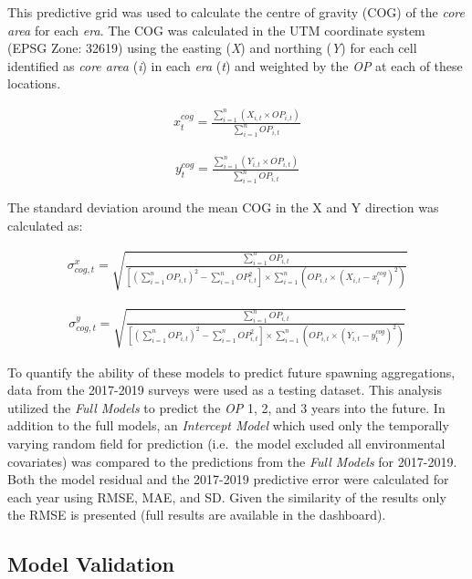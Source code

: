 \documentclass[
]{article}
\begin{document}
This predictive grid was used to calculate the centre of gravity (COG) of the \emph{core area} for each \emph{era}. The COG was calculated in the UTM coordinate system (EPSG Zone: 32619) using the easting (\emph{X}) and northing (\emph{Y}) for each cell identified as \emph{core area} (\emph{i}) in each \emph{era} (\emph{t}) and weighted by the \emph{OP} at each of these locations.

\begin{align} 
x_{t}^{cog} = \frac{\sum_{i=1}^{n} (X_{i,t} \times OP_{i,t})}{\sum_{i=1}^{n}OP_{i,t}} 
\end{align}

\begin{align}
y_{t}^{cog} = \frac{\sum_{i=1}^{n} (Y_{i,t} \times OP_{i,t})}{\sum_{i=1}^{n}OP_{i,t}}
\end{align}

The standard deviation around the mean COG in the X and Y direction was calculated as:

\begin{align}
\sigma_{cog,t}^{x} = \sqrt{\frac{ \sum_{i=1}^{n}OP_{i,t}} { [(\sum_{i=1}^{n}OP_{i,t})^2 - \sum_{i=1}^{n}OP_{i,t}^2] \times \sum_{i=1}^{n} (OP_{i,t}  \times (X_{i,t} - x_{t}^{cog})^2)}} 
\end{align}

\begin{align}
\sigma_{cog,t}^{y} = \sqrt {\frac{ \sum_{i=1}^{n}OP_{i,t}} { [(\sum_{i=1}^{n}OP_{i,t})^2 - \sum_{i=1}^{n}OP_{i,t}^2] \times \sum_{i=1}^{n} (OP_{i,t}  \times (Y_{i,t} - y_{t}^{cog})^2)}} 
\end{align}

To quantify the ability of these models to predict future spawning aggregations, data from the 2017-2019 surveys were used as a testing dataset. This analysis utilized the \emph{Full Models} to predict the \emph{OP} 1, 2, and 3 years into the future. In addition to the full models, an \emph{Intercept Model} which used only the temporally varying random field for prediction (i.e.~the model excluded all environmental covariates) was compared to the predictions from the \emph{Full Models} for 2017-2019. Both the model residual and the 2017-2019 predictive error were calculated for each year using RMSE, MAE, and SD. Given the similarity of the results only the RMSE is presented (full results are available in the dashboard).

\hypertarget{model-validation}{%
\subsection{Model Validation}\label{model-validation}}
\end{document}
